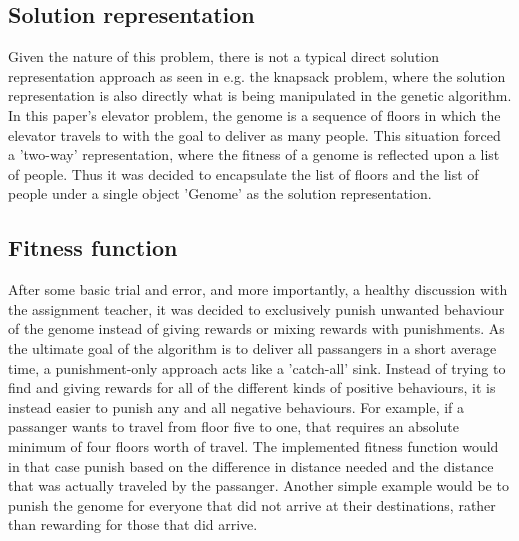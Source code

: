 \subsection{Solution representation}

Given the nature of this problem, there is not a typical direct solution representation approach as seen in e.g. the knapsack problem, where the solution representation is also directly what is being manipulated in the genetic algorithm. In this paper's elevator problem, the genome is a sequence of floors in which the elevator travels to with the goal to deliver as many people. This situation forced a 'two-way' representation, where the fitness of a genome is reflected upon a list of people. Thus it was decided to encapsulate the list of floors and the list of people under a single object 'Genome' as the solution representation.

\subsection{Fitness function}
\label{subsec:fitness_function}

After some basic trial and error, and more importantly, a healthy discussion with the assignment teacher, it was decided to exclusively punish unwanted behaviour of the genome instead of giving rewards or mixing rewards with punishments. As the ultimate goal of the algorithm is to deliver all passangers in a short average time, a punishment-only approach acts like a 'catch-all' sink. Instead of trying to find and giving rewards for all of the different kinds of positive behaviours, it is instead easier to punish any and all negative behaviours. For example, if a passanger wants to travel from floor five to one, that requires an absolute minimum of four floors worth of travel. The implemented fitness function would in that case punish based on the difference in distance needed and the distance that was actually traveled by the passanger. Another simple example would be to punish the genome for everyone that did not arrive at their destinations, rather than rewarding for those that did arrive.




